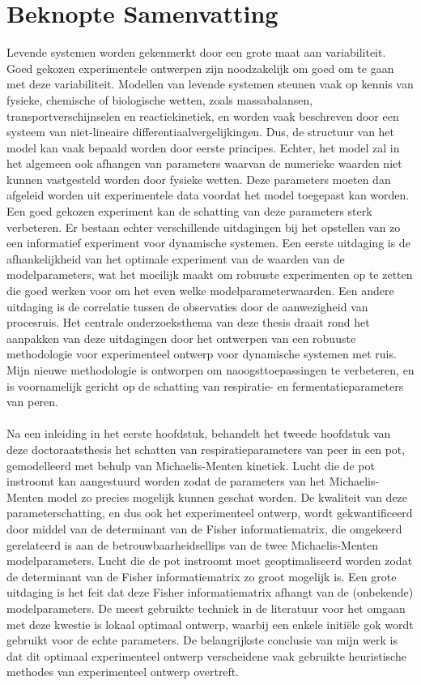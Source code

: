 \chapter*{Beknopte Samenvatting}
Levende systemen worden gekenmerkt door een grote maat aan variabiliteit. Goed gekozen experimentele
ontwerpen zijn noodzakelijk om goed om te gaan met deze variabiliteit. Modellen van levende systemen steunen vaak op kennis van fysieke, chemische of biologische wetten, zoals massabalansen, transportverschijnselen en reactiekinetiek, en worden vaak beschreven door een systeem van niet-lineaire differentiaalvergelijkingen. Dus, de structuur van het model kan vaak bepaald worden door eerste principes. Echter, het model zal in het algemeen ook afhangen van parameters waarvan de numerieke waarden niet kunnen vastgesteld worden door fysieke wetten. Deze parameters moeten dan afgeleid worden uit experimentele data voordat het model toegepast kan worden. Een goed gekozen experiment kan de schatting van deze parameters sterk verbeteren. Er bestaan echter verschillende uitdagingen bij het opstellen van zo een informatief experiment voor dynamische systemen. Een eerste uitdaging is de afhankelijkheid van het optimale experiment van de waarden van de modelparameters, wat het moeilijk maakt om robuuste experimenten op te zetten die goed werken voor om het even welke modelparameterwaarden. Een andere uitdaging is de correlatie tussen de observaties door de aanwezigheid van procesruis. Het centrale onderzoeksthema van deze thesis draait rond het aanpakken van deze uitdagingen door het ontwerpen van een robuuste methodologie voor experimenteel ontwerp voor dynamische systemen met ruis. Mijn nieuwe methodologie is ontworpen om naoogsttoepassingen te verbeteren, en is voornamelijk gericht op de schatting van respiratie- en fermentatieparameters van peren.
\\
\\
Na een inleiding in het eerste hoofdstuk, behandelt het tweede hoofdstuk van deze doctoraatsthesis het schatten van respiratieparameters van peer in een pot, gemodelleerd met behulp van Michaelis-Menten kinetiek. Lucht die de pot instroomt kan aangestuurd worden zodat de parameters van het Michaelis-Menten model zo precies mogelijk kunnen
geschat worden. De kwaliteit van deze parameterschatting, en dus ook het experimenteel ontwerp, wordt gekwantificeerd door middel van de determinant van de Fisher informatiematrix, die omgekeerd gerelateerd is aan de betrouwbaarheidsellips van de twee Michaelis-Menten modelparameters. Lucht die de pot instroomt moet geoptimaliseerd worden zodat de determinant van de Fisher informatiematrix zo groot mogelijk is. Een grote uitdaging is het feit dat deze Fisher informatiematrix afhangt van de (onbekende) modelparameters.  De meest gebruikte techniek in de literatuur voor het omgaan met deze kwestie is lokaal optimaal ontwerp, waarbij een enkele initiële gok wordt gebruikt voor de echte parameters. De belangrijkste conclusie van mijn werk is dat dit optimaal experimenteel ontwerp verscheidene vaak gebruikte heuristische methodes van experimenteel ontwerp overtreft.
